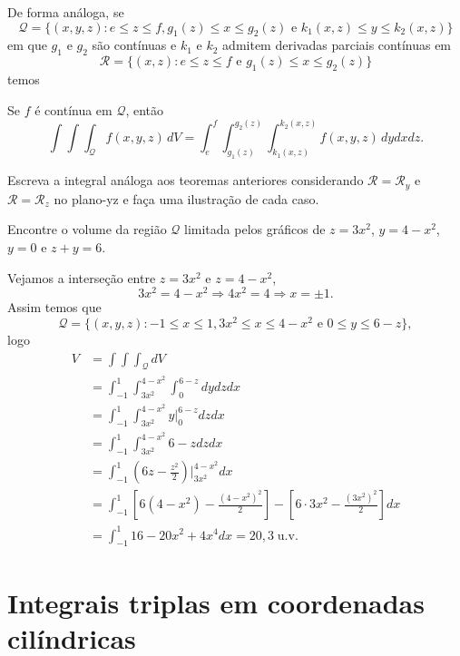 De forma análoga, se \[\mathcal{Q} = \{(x,y,z) : e \leq z \leq f, g_1(z) \leq x \leq g_2(z) \text{ e } k_1(x,z)\leq y \leq k_2(x,z)\}\] em que \(g_1\) e \(g_2\) são contínuas e \(k_1\) e \(k_2\) admitem derivadas parciais contínuas em \[\mathcal{R} = \{(x,z) : e\leq z\leq f \text{ e } g_1(z)\leq x\leq g_2(z)\}\] temos
\begin{theorem}
    Se \(f\) é contínua em \(\mathcal{Q}\), então \[\int\int\int_\mathcal{Q} f(x,y,z)\, dV = \int_e^f \int_{g_1(z)}^{g_2(z)} \int_{k_1(x,z)}^{k_2(x,z)} f(x,y,z)\, dy dx dz.\]
\end{theorem}

\begin{exercise}
    Escreva a integral análoga aos teoremas anteriores considerando \(\mathcal{R} = \mathcal{R}_y\) e \(\mathcal{R} = \mathcal{R}_z\) no plano-yz e faça uma ilustração de cada caso.
\end{exercise}

\begin{example}
    Encontre o volume da região \(\mathcal{Q}\) limitada pelos gráficos de \(z = 3x^2\), \(y = 4-x^2\), \(y = 0\) e \(z+y = 6\).

    Vejamos a interseção entre \(z = 3x^2\) e \(z = 4 - x^2\),
        \[3x^2 = 4-x^2 \Rightarrow 4x^2 = 4 \Rightarrow x = \pm 1.\]
    Assim temos que \[\mathcal{Q} = \{(x,y,z) : -1\leq x\leq 1, 3x^2 \leq x \leq 4-x^2 \text{ e } 0\leq y \leq 6-z\},\] logo
        \begin{align*}
            V
                & = \int\int\int_\mathcal{Q} dV \\
                & = \int_{-1}^1 \int_{3x^2}^{4-x^2} \int_0^{6-z} dy dz dx \\
                & = \int_{-1}^1 \int_{3x^2}^{4-x^2} y\bigg|_0^{6-z} dz dx \\
                & = \int_{-1}^1 \int_{3x^2}^{4-x^2} 6-z dz dx \\
                & = \int_{-1}^1 \left( 6z - \frac{z^2}{2} \right)\bigg|_{3x^2}^{4-x^2} dx \\
                & = \int_{-1}^{1} \left[ 6(4-x^2) - \frac{(4-x^2)^2}{2} \right] - \left[ 6\cdot 3x^2 - \frac{(3x^2)^2}{2} \right] dx \\
                & = \int_{-1}^1 16 - 20x^2 + 4x^4 dx = 20,3\operatorname{u.v.}
        \end{align*}
\end{example}

\section{Integrais triplas em coordenadas cilíndricas}

